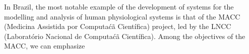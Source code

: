 In Brazil, the most notable example of the development of systems for the modelling and analysis of human physiological systems is that of the MACC (Medicina Assistida por Computa\'c\~a Cient\'ifica) project, led by the LNCC (Laborat\'orio Nacional de Computa\'c\~a Cient\'ifica). Among the objectives of the MACC, we can emphasize


% 
% 
% 
